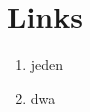 \section{Links}\label{sec:links}
\begin{enumerate}
    \item jeden\label{itm:pierwsze}
    \item dwa
\end{enumerate}
